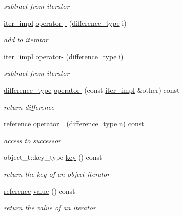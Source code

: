 \begin{DoxyCompactItemize}
\begin{DoxyCompactList}\small\item\em subtract from iterator \end{DoxyCompactList}\item 
\hyperlink{classnlohmann_1_1basic__json_1_1iter__impl}{iter\+\_\+impl} \hyperlink{classnlohmann_1_1basic__json_1_1iter__impl_a3b4cd7db9a93609f8e05f1759d38d633}{operator+} (\hyperlink{classnlohmann_1_1basic__json_1_1iter__impl_aa3d908ee643e5938d32e5f6d261d7715}{difference\+\_\+type} i)
\begin{DoxyCompactList}\small\item\em add to iterator \end{DoxyCompactList}\item 
\hyperlink{classnlohmann_1_1basic__json_1_1iter__impl}{iter\+\_\+impl} \hyperlink{classnlohmann_1_1basic__json_1_1iter__impl_a926f2f9189403e72e4f694a06d4d021a}{operator-\/} (\hyperlink{classnlohmann_1_1basic__json_1_1iter__impl_aa3d908ee643e5938d32e5f6d261d7715}{difference\+\_\+type} i)
\begin{DoxyCompactList}\small\item\em subtract from iterator \end{DoxyCompactList}\item 
\hyperlink{classnlohmann_1_1basic__json_1_1iter__impl_aa3d908ee643e5938d32e5f6d261d7715}{difference\+\_\+type} \hyperlink{classnlohmann_1_1basic__json_1_1iter__impl_a8f17cacd2b5ac9824b9d3de4788ea0d3}{operator-\/} (const \hyperlink{classnlohmann_1_1basic__json_1_1iter__impl}{iter\+\_\+impl} \&other) const 
\begin{DoxyCompactList}\small\item\em return difference \end{DoxyCompactList}\item 
\hyperlink{classnlohmann_1_1basic__json_1_1iter__impl_ae09599e9cb4a947020a0265c0c4f3d5e}{reference} \hyperlink{classnlohmann_1_1basic__json_1_1iter__impl_a9418faa633b30a3621a672860b285c3a}{operator\mbox{[}$\,$\mbox{]}} (\hyperlink{classnlohmann_1_1basic__json_1_1iter__impl_aa3d908ee643e5938d32e5f6d261d7715}{difference\+\_\+type} n) const 
\begin{DoxyCompactList}\small\item\em access to successor \end{DoxyCompactList}\item 
object\+\_\+t\+::key\+\_\+type \hyperlink{classnlohmann_1_1basic__json_1_1iter__impl_afea58057767b8bcdb8c35059ee9a445f}{key} () const 
\begin{DoxyCompactList}\small\item\em return the key of an object iterator \end{DoxyCompactList}\item 
\hyperlink{classnlohmann_1_1basic__json_1_1iter__impl_ae09599e9cb4a947020a0265c0c4f3d5e}{reference} \hyperlink{classnlohmann_1_1basic__json_1_1iter__impl_a2597c381f70b376336bd4faa87fadc28}{value} () const 
\begin{DoxyCompactList}\small\item\em return the value of an iterator \end{DoxyCompactList}\end{DoxyCompactItemize}
